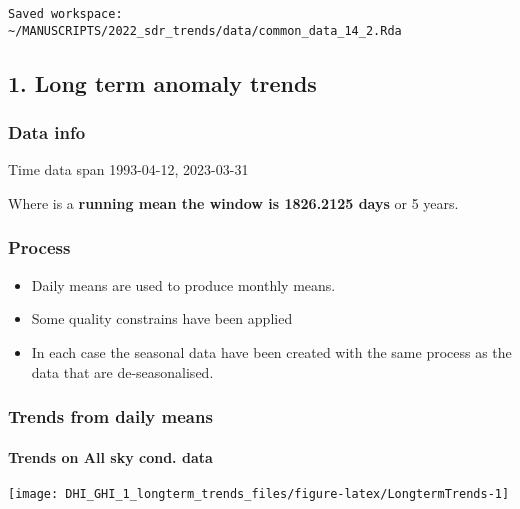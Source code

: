 \documentclass[
  10pt,
  a4paper,oneside]{article}
\providecommand{\tightlist}{%
  \setlength{\itemsep}{0pt}\setlength{\parskip}{0pt}}
\begin{document}
\begin{verbatim}
Saved workspace: ~/MANUSCRIPTS/2022_sdr_trends/data/common_data_14_2.Rda 
\end{verbatim}

\hypertarget{long-term-anomaly-trends}{%
\subsection{1. Long term anomaly trends}\label{long-term-anomaly-trends}}

\hypertarget{data-info}{%
\subsubsection{Data info}\label{data-info}}

Time data span 1993-04-12, 2023-03-31

Where is a \textbf{running mean the window is 1826.2125 days} or
5 years.

\hypertarget{process}{%
\subsubsection{Process}\label{process}}

\begin{itemize}
\tightlist
\item
  Daily means are used to produce monthly means.
\item
  Some quality constrains have been applied
\item
  In each case the seasonal data have been created with the same process as
  the data that are de-seasonalised.
\end{itemize}

\newpage
\FloatBarrier

\hypertarget{trends-from-daily-means}{%
\subsubsection{Trends from daily means}\label{trends-from-daily-means}}

\newpage

\hypertarget{trends-on-all-sky-cond.-data}{%
\paragraph{Trends on All sky cond. data}\label{trends-on-all-sky-cond.-data}}

\begin{center}\texttt{[image: DHI\_GHI\_1\_longterm\_trends\_files/figure-latex/LongtermTrends-1]} \end{center}
\end{document}
